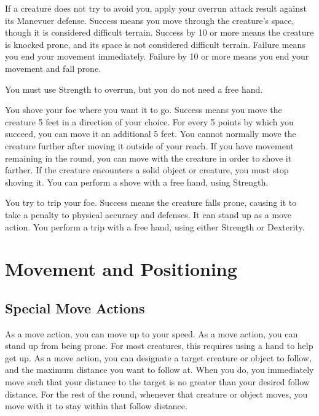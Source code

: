             If a creature does not try to avoid you, apply your overrun attack result against its Manevuer defense.
            Success means you move through the creature's space, though it is considered difficult terrain.
            Success by 10 or more means the creature is knocked prone, and its space is not considered difficult terrain.
            Failure means you end your movement immediately.
            Failure by 10 or more means you end your movement and fall prone.

            You must use Strength to overrun, but you do not need a free hand.

            \label{Shove} You shove your foe where you want it to go. Success means you move the creature 5 feet in a direction of your choice. For every 5 points by which you succeed, you can move it an additional 5 feet. You cannot normally move the creature further after moving it outside of your reach. If you have movement remaining in the round, you can move with the creature in order to shove it farther. If the creature encounters a solid object or creature, you must stop shoving it. You can perform a shove with a free hand, using Strength.

            \label{Trip} You try to trip your foe. Success means the creature falls prone, causing it to take a  penalty to physical accuracy and defenses. It can stand up as a move action. You perform a trip with a free hand, using either Strength or Dexterity.

\section{Movement and Positioning}

    \subsection{Special Move Actions}

         As a move action, you can move up to your speed.
         As a move action, you can stand up from being prone. For most creatures, this requires using a hand to help get up.
         As a move action, you can designate a target creature or object to follow, and the maximum distance you want to follow at. When you do, you immediately move such that your distance to the target is no greater than your desired follow distance. For the rest of the round, whenever that creature or object moves, you move with it to stay within that follow distance.

